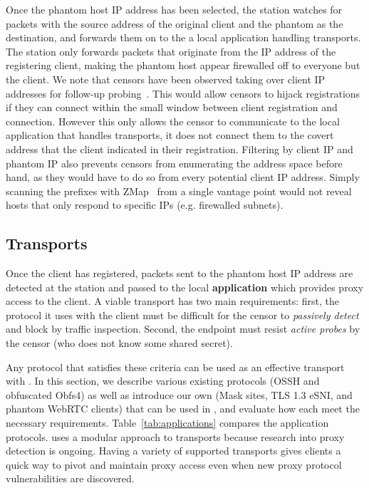 \documentclass[sigconf,anonymous]{acmart}
\begin{document}
Once the phantom host IP address has been selected, the station watches for
packets with the source address of the original client and the phantom as the destination, 
and forwards them on to the a local application handling transports. The station only 
forwards packets that originate from the IP address of the registering client, making the
 phantom host appear firewalled off to everyone but the client.
We note that censors have been observed taking over client IP
addresses for follow-up probing~\cite{ensafi-tor}. This would allow censors to
hijack registrations if they can connect within the small window between client 
registration and connection. However this only 
allows the censor to communicate to the local application that handles transports, 
it does not connect them to the covert address that the client indicated in their registration. 
Filtering by client IP and phantom IP also prevents censors from enumerating the
address space before hand, as they would have to do so from every potential
client IP address. Simply scanning the prefixes with ZMap~\cite{zmap13} from a
single vantage point would not reveal hosts that only respond to specific IPs
(e.g. firewalled subnets).


\subsection{Transports}


Once the client has registered, packets sent to the phantom host IP address are
detected at the station and passed to the local \textbf{application} which provides
proxy access to the client. A viable \scheme transport has
two main requirements: first, the protocol it uses with the client 
must be difficult for the censor to \emph{passively detect} and block by traffic
inspection. Second, the endpoint must resist \emph{active probes} by the censor (who
does not know some shared secret). 

Any protocol that satisfies these criteria can be used as an effective transport
with \scheme. In this section, we describe various existing protocols (OSSH and obfuscated Obfs4) as well
as introduce our own (Mask sites, TLS 1.3 eSNI, and phantom WebRTC clients) that
can be used in \scheme, and evaluate how each meet the necessary requirements.
Table~\ref{tab:applications} compares the application protocols. \scheme uses a modular 
approach to transports because research into proxy detection is ongoing.
Having a variety of supported transports gives clients a quick way to pivot and 
maintain proxy access even when new proxy protocol vulnerabilities are discovered.
\end{document}
